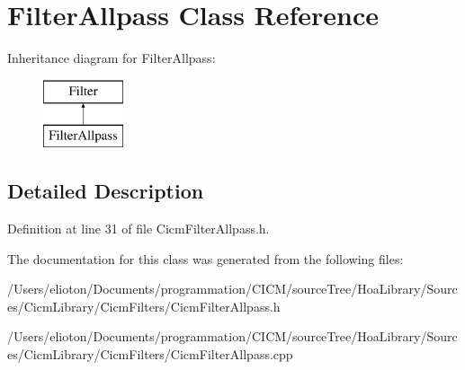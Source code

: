 \hypertarget{class_filter_allpass}{\section{Filter\-Allpass Class Reference}
\label{class_filter_allpass}
}
Inheritance diagram for Filter\-Allpass\-:\begin{figure}[H]
\begin{center}
\leavevmode
\includegraphics[height=2.000000cm]{class_filter_allpass}
\end{center}
\end{figure}


\subsection{Detailed Description}


Definition at line 31 of file Cicm\-Filter\-Allpass.\-h.



The documentation for this class was generated from the following files\-:\begin{DoxyCompactItemize}
\item 
/\-Users/elioton/\-Documents/programmation/\-C\-I\-C\-M/source\-Tree/\-Hoa\-Library/\-Sources/\-Cicm\-Library/\-Cicm\-Filters/Cicm\-Filter\-Allpass.\-h\item 
/\-Users/elioton/\-Documents/programmation/\-C\-I\-C\-M/source\-Tree/\-Hoa\-Library/\-Sources/\-Cicm\-Library/\-Cicm\-Filters/Cicm\-Filter\-Allpass.\-cpp\end{DoxyCompactItemize}
